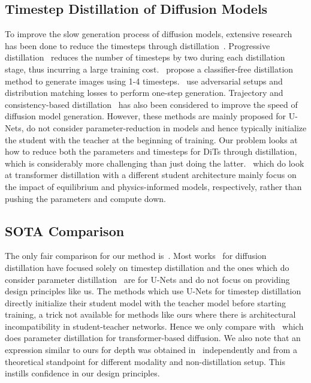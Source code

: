 \subsection{Timestep Distillation of Diffusion Models}
To improve the slow generation process of diffusion models, extensive research has been done to reduce the timesteps through distillation~\citep{luhman2021knowledge, salimans2022progressive, meng2023distillation, yin2024one, yin2024improved, zhou2024score}. Progressive distillation~\citep{salimans2022progressive} reduces the number of timesteps by two during each distillation stage, thus incurring a large training cost.~\citep{meng2023distillation} propose a classifier-free distillation method to generate images using 1-4 timesteps.~\citep{yin2024one, yin2024improved} use adversarial setups and distribution matching losses to perform one-step generation. Trajectory and consistency-based distillation~\citep{berthelot2023tract, song2023consistency, zheng2024trajectory} has also been considered to improve the speed of diffusion model generation. However, these methods are mainly proposed for U-Nets, do not consider parameter-reduction in models and hence typically initialize the student with the teacher at the beginning of training. Our problem looks at how to reduce both the parameters and timesteps for DiTs through distillation, which is considerably more challenging than just doing the latter.~\citep{geng2024one, teephysics} which do look at transformer distillation with a different student architecture mainly focus on the impact of equilibrium and physics-informed models, respectively, rather than pushing the parameters and compute down.

\subsection{SOTA Comparison}
\label{appsubsec: SOTA}
The only fair comparison for our method is~\citep{geng2024one}. Most works~\citep{yin2024one, yin2024improved, berthelot2023tract} for diffusion distillation have focused solely on timestep distillation and the ones which do consider parameter distillation~\citep{teephysics, dockhorn2023distilling} are for U-Nets and do not focus on providing design principles like us. The methods which use U-Nets for timestep distillation directly initialize their student model with the teacher model before starting training, a trick not available for methods like ours where there is architectural incompatibility in student-teacher networks. Hence we only compare with~\citep{geng2024one} which does parameter distillation for transformer-based diffusion. We also note that an expression similar to ours for depth was obtained in~\citep{wies2021transformer} independently and from a theoretical standpoint for different modality and non-distillation setup. This instills confidence in our design principles.
